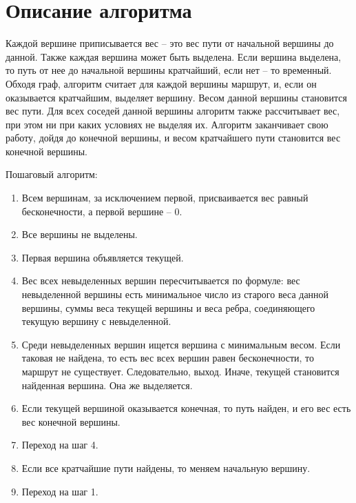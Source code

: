 \documentclass{report}
\begin{document}
\section*{Описание алгоритма}
\par Каждой вершине приписывается вес – это вес пути от начальной вершины до данной. Также каждая вершина может быть выделена. Если вершина выделена, то путь от нее до начальной вершины кратчайший, если нет – то временный. Обходя граф, алгоритм считает для каждой вершины маршрут, и, если он оказывается кратчайшим, выделяет вершину. Весом данной вершины становится вес пути. Для всех соседей данной вершины алгоритм также рассчитывает вес, при этом ни при каких условиях не выделяя их. Алгоритм заканчивает свою работу, дойдя до конечной вершины, и весом кратчайшего пути становится вес конечной вершины.
\par Пошаговый алгоритм:
\begin{enumerate}
\item Всем вершинам, за исключением первой, присваивается вес равный бесконечности, а первой вершине – 0.
\item Все вершины не выделены.
\item Первая вершина объявляется текущей.
\item Вес всех невыделенных вершин пересчитывается по формуле: вес невыделенной вершины есть минимальное число из старого веса данной вершины, суммы веса текущей вершины и веса ребра, соединяющего текущую вершину с невыделенной.
\item Среди невыделенных вершин ищется вершина с минимальным весом. Если таковая не найдена, то есть вес всех вершин равен бесконечности, то маршрут не существует. Следовательно, выход. Иначе, текущей становится найденная вершина. Она же выделяется.
\item Если текущей вершиной оказывается конечная, то путь найден, и его вес есть вес конечной вершины.
\item Переход на шаг 4.
\item Если все кратчайшие пути найдены, то меняем начальную вершину.
\item Переход на шаг 1.
\end{enumerate}
\newpage

\end{document}
